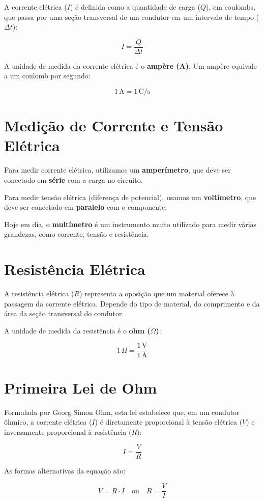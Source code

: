 A corrente elétrica ($I$) é definida como a quantidade de carga ($Q$), em coulombs, que passa por uma seção transversal de um condutor em um intervalo de tempo ($\Delta t$):

\[
I = \frac{Q}{\Delta t}
\]

A unidade de medida da corrente elétrica é o \textbf{ampère (A)}. Um ampère equivale a um coulomb por segundo:

\[
1\,\text{A} = 1\,\text{C/s}
\]

\section{Medição de Corrente e Tensão Elétrica}

Para medir corrente elétrica, utilizamos um \textbf{amperímetro}, que deve ser conectado em \textbf{série} com a carga no circuito.

Para medir tensão elétrica (diferença de potencial), usamos um \textbf{voltímetro}, que deve ser conectado em \textbf{paralelo} com o componente.

Hoje em dia, o \textbf{multímetro} é um instrumento muito utilizado para medir várias grandezas, como corrente, tensão e resistência.


\section{Resistência Elétrica}

A resistência elétrica ($R$) representa a oposição que um material oferece à passagem da corrente elétrica. Depende do tipo de material, do comprimento e da área da seção transversal do condutor.

A unidade de medida da resistência é o \textbf{ohm ($\Omega$)}:

\[
1\,\Omega = \frac{1\,\text{V}}{1\,\text{A}}
\]

\section{Primeira Lei de Ohm}

Formulada por Georg Simon Ohm, esta lei estabelece que, em um condutor ôhmico, a corrente elétrica ($I$) é diretamente proporcional à tensão elétrica ($V$) e inversamente proporcional à resistência ($R$):

\[
I = \frac{V}{R}
\]

As formas alternativas da equação são:

\[
V = R \cdot I \quad \text{ou} \quad R = \frac{V}{I}
\]

